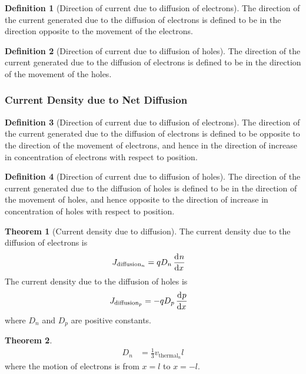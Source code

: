 \documentclass[titlepage, fleqn, a4paper, 12pt, twoside]{article}
\theoremstyle{definition}
\newtheorem{definition}{Definition}
\theoremstyle{theorem}
\newtheorem{theorem}{Theorem}
\let\Oldsubsubsection\subsubsection
\renewcommand{\subsubsection}{\FloatBarrier\Oldsubsubsection}
\begin{document}
\begin{definition}[Direction of current due to diffusion of electrons]
	The direction of the current generated due to the diffusion of electrons is defined to be in the direction opposite to the movement of the electrons.
\end{definition}

\begin{definition}[Direction of current due to diffusion of holes]
	The direction of the current generated due to the diffusion of electrons is defined to be in the direction of the movement of the holes.
\end{definition}

\subsubsection{Current Density due to Net Diffusion}

\begin{definition}[Direction of current due to diffusion of electrons]
	The direction of the current generated due to the diffusion of electrons is defined to be opposite to the direction of the movement of electrons, and hence in the direction of increase in concentration of electrons with respect to position.
\end{definition}

\begin{definition}[Direction of current due to diffusion of holes]
	The direction of the current generated due to the diffusion of holes is defined to be in the direction of the movement of holes, and hence opposite to the direction of increase in concentration of holes with respect to position.
\end{definition}

\begin{theorem}[Current density due to diffusion]
	The current density due to the diffusion of electrons is
	\begin{align*}
		J_{\text{diffusion}_n} &= q D_n \dod{n}{x}
	\end{align*}
	The current density due to the diffusion of holes is
	\begin{align*}
		J_{\text{diffusion}_p} &= -q D_p \dod{p}{x}
	\end{align*}
	where $D_n$ and $D_p$ are positive constants.
\end{theorem}

\begin{theorem}
	\begin{align*}
		D_n &= \frac{1}{3} v_{\text{thermal}_n} l
	\end{align*}
	where the motion of electrons is from $x = l$ to $x = -l$.
\end{theorem}
\end{document}
